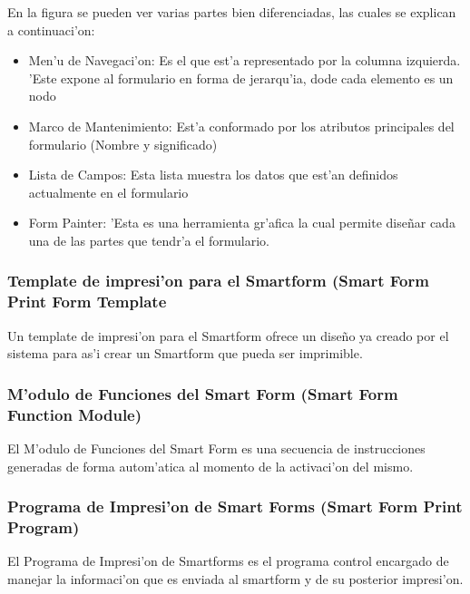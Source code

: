 	En la figura se pueden ver varias partes bien diferenciadas, las cuales se explican a continuaci'on:
\begin{itemize}
\item Men'u de Navegaci'on: Es el que est'a representado por la columna izquierda. 'Este expone al formulario en forma de jerarqu'ia, dode cada elemento es un nodo
\item Marco de Mantenimiento: Est'a conformado por los atributos principales del formulario (Nombre y significado)
\item Lista de Campos: Esta lista muestra los datos que est'an definidos actualmente en el formulario
\item Form Painter: 'Esta es una herramienta gr'afica la cual permite dise\~nar cada una de las partes que tendr'a el formulario.
\end{itemize}
\subsubsection{Template de impresi'on para el Smartform (Smart Form Print Form Template}
	Un template de impresi'on para el Smartform ofrece un dise\~no ya creado por el sistema para as'i crear un Smartform que pueda ser imprimible.
\subsubsection{M'odulo de Funciones del Smart Form (Smart Form Function Module)}
	El M'odulo de Funciones del Smart Form es una secuencia de instrucciones generadas de forma autom'atica al momento de la activaci'on del  mismo.
\subsubsection{Programa de Impresi'on de Smart Forms (Smart Form Print Program)}
	El Programa de Impresi'on de Smartforms es el programa control encargado de manejar la informaci'on que es enviada al smartform y de su posterior impresi'on. 
	
